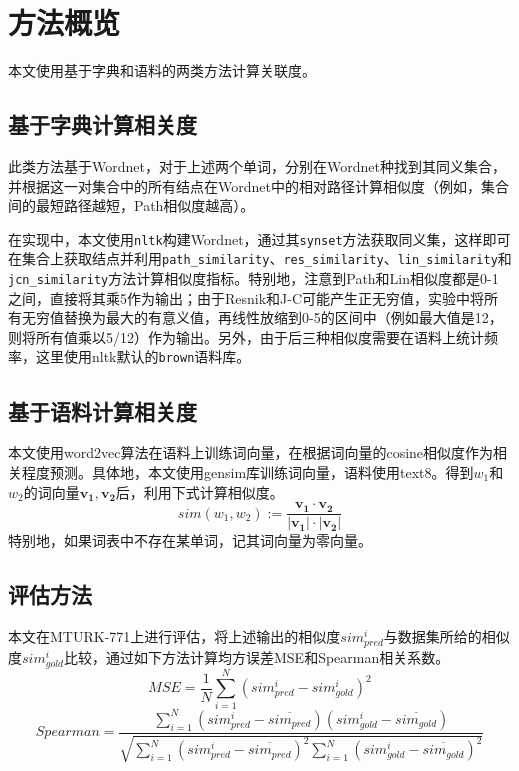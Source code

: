 \documentclass{article}
\begin{document}
\section{方法概览}
本文使用基于字典和语料的两类方法计算关联度。
\subsection{基于字典计算相关度}
此类方法基于Wordnet，对于上述两个单词，分别在Wordnet种找到其同义集合，并根据这一对集合中的所有结点在Wordnet中的相对路径计算相似度（例如，集合间的最短路径越短，Path相似度越高）。

在实现中，本文使用\texttt{nltk}构建Wordnet，通过其\texttt{synset}方法获取同义集，这样即可在集合上获取结点并利用\texttt{path\_similarity}、\texttt{res\_similarity}、\texttt{lin\_similarity}和\texttt{jcn\_similarity}方法计算相似度指标。特别地，注意到Path和Lin相似度都是0-1之间，直接将其乘5作为输出；由于Resnik和J-C可能产生正无穷值，实验中将所有无穷值替换为最大的有意义值，再线性放缩到0-5的区间中（例如最大值是12，则将所有值乘以5/12）作为输出。另外，由于后三种相似度需要在语料上统计频率，这里使用nltk默认的\texttt{brown}语料库。

\subsection{基于语料计算相关度}
本文使用word2vec算法在语料上训练词向量，在根据词向量的cosine相似度作为相关程度预测。具体地，本文使用gensim库训练词向量，语料使用text8。得到$w_1$和$w_2$的词向量$\mathbf{v_1}, \mathbf{v_2}$后，利用下式计算相似度。
\[ sim(w_1, w_2) := \frac{\mathbf{v_1}\cdot \mathbf{v_2}}{|\mathbf{v_1}|\cdot |\mathbf{v_2}|} \]
特别地，如果词表中不存在某单词，记其词向量为零向量。

\subsection{评估方法}
本文在MTURK-771上进行评估，将上述输出的相似度$sim_{pred}^i$与数据集所给的相似度$sim_{gold}^i$比较，通过如下方法计算均方误差MSE和Spearman相关系数。
\[ MSE = \frac{1}{N} \sum\limits_{i=1}^{N} {(sim_{pred}^i-sim_{gold}^i)}^2 \]
\[ Spearman = \frac{\sum\limits_{i=1}^N (sim_{pred}^i - \overline{sim_{pred}})(sim_{gold}^i - \overline{sim_{gold}})}{\sqrt{\sum\limits_{i=1}^N {(sim_{pred}^i - \overline{sim_{pred}})}^2  \sum\limits_{i=1}^N {(sim_{gold}^i - \overline{sim_{gold}})}^2}} \]
\end{document}

